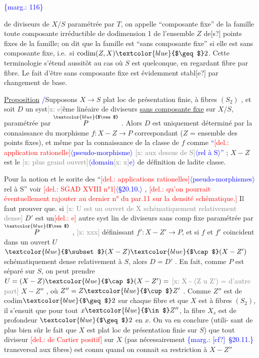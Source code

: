 \documentclass[11pt]{article}
\newcommand{\scanpage}[1]{\par\bigskip\noindent{\small\sffamily[scan #1]}\par}
\newcommand{\mspage}[1]{{\small\sffamily[p.\,#1]}}
\newcommand{\hand}[1]{\textcolor{blue}{#1}}
\let\over\relax
\newcommand{\over}[2]{\textcolor{gray}{#1}\textcolor{blue}{\ensuremath{^{\!\nearrow}}#2}}
\newcommand{\inserted}[2][]{\textcolor{blue}{$\langle$#2$\rangle$}}
\newcommand{\margin}[1]{\textcolor{blue}{\{\textsf{marg.:} #1\}}}
\newcommand{\deleted}[1]{\textcolor{red}{[\textsf{del.:} #1]}}
\newcommand{\xout}[1]{\textcolor{gray}{[\textsf{x:} #1]}}
\newcommand{\uline}[1]{\underline{#1}}
\newcommand{\unsure}[1]{[#1?]}
\newcommand{\illegible}[1]{[\textsf{illeg.\ #1}]}
\begin{document}
\margin{116}

\clearpage
\scanpage{25/117}
\mspage{20}

de diviseurs de $X/S$ paramétrée par $T$, on appelle ``composante fixe'' de la
famille toute composante irréductible de dodimension 1 de l'ensemble $Z$ de\unsure{s}
points fixes de la famille; on dit que la famille est ``sans composante
fixe'' si elle est sans composante fixe, i.e.\ si $\operatorname{codim}(Z,X) \hand{$\geq$} 2$. Cette
terminologie s'étend aussitôt au cas où $S$ est quelconque, en regardant
fibre par fibre. Le fait d'être sans composante fixe est évidemment stabl\unsure{e}
par changement de base.

\uline{Proposition}\over{2}{\illegible{1}} \hand{/}Supposons $X \longrightarrow S$ plat loc de présentation finie, à fibres
$(S_2)$ , et soit $D$ un syst\xout{e}ême linéaire de diviseurs \uline{sans composante fixe}
sur $X/S$, paramétrée par $\overset{\hand{$\vee$}}{P}$ . Alors $D$ est uniquement déterminé par la
connaissance du morphisme $f: X - Z \longrightarrow P$ correspondant ($Z$ = ensemble
des points fixes), et même par la connaissance de la classe de $f$ comme
\hand{``}\deleted{application rationelle}\inserted{pseudo-morphisme} \xout{aux dessus de S}\inserted[typed]{rel à S}\hand{''} ; $X-Z$ est le \xout{plus grand ouvert}\inserted[typed]{domain\xout{x}e}
de définition de ladite classe.

Pour la notion et le sorite des ``\deleted{applications rationelles}\inserted{pseudo-morphismes}
rel à S'' voir \deleted{SGAD XVIII n°1}\inserted{\S 20.10.} , \deleted{qu'on pourrait éventuellement rajouter
au dernier n° du par.11 sur la densité schématique.} Il faut prouver que.
si \xout{U est un ouvert de X schématiquement relativement dense} $D'$ est un\deleted{e}
autre syst lin de diviseurs sans comp fixe paramétrée par $\overset{\hand{$\vee$}}{P}$ , \xout{xxx}
définissant $f': X-Z' \longrightarrow P$, et si $f$ et $f'$ coincident dans un ouvert $U$
$\hand{$\subset$} (X-Z)\hand{$\cap$}(X-Z')$ schématiquement dense relativement à $S$, alors $D=D'$ .
En fait, comme $P$ est séparé sur $S$, on peut prendre $U=(X-Z)\hand{$\cap$}(X-Z') =$
\xout{X - (Z u Z') = d'autre part} $X-Z''$ , où $Z'' = Z\hand{$\cup$}Z'$ . Comme $Z''$ est de codim$\hand{$\geq$}2$
sur chaque fibre et que $X$ est à fibres $(S_2)$, il s'ensuit que pour tout
$x\hand{$\in$} Z''$, la fibre $X_s$ est de profondeur $\hand{$\geq$}2$ en $x$. On va en conclure (utili-%
sant de plus bien sûr le fait que $X$ est plat loc de présentation finie
sur $S$) que tout diviseur \deleted{de Cartier positif} sur $X$ (pas nécessairement \margin{\unsure{cf}\ \S 20.11.}
transversal aux fibres) est connu quand on connait sa restriction à $X-Z''$
\end{document}
